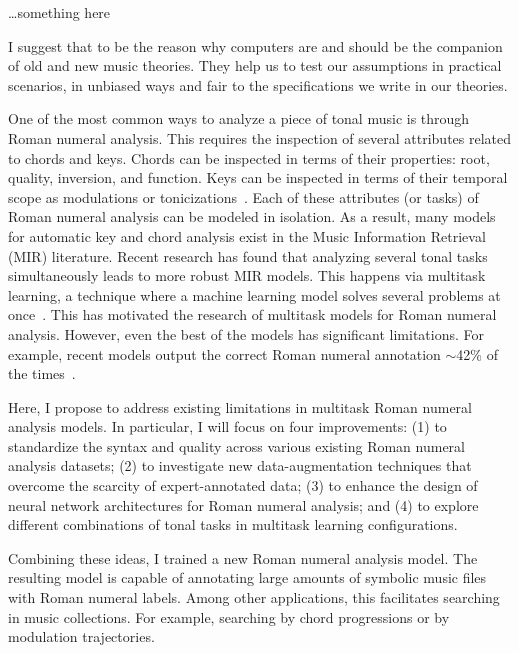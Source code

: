 \dots something here

I suggest that to be the reason why computers are and should
be the companion of old and new music theories. They help us
to test our assumptions in practical scenarios, in unbiased
ways and fair to the specifications we write in our theories.

One of the most common ways to analyze a piece of tonal
music is through Roman numeral analysis. This requires the
inspection of several attributes related to chords and keys.
Chords can be inspected in terms of their properties: root,
quality, inversion, and function. Keys can be inspected in
terms of their temporal scope as modulations or
tonicizations~\parencite{napoles_lopez2020local}. Each of
these attributes (or tasks) of Roman numeral analysis can be
modeled in isolation. As a result, many models for automatic
key and chord analysis exist in the Music Information
Retrieval (MIR) literature. Recent research has found that
analyzing several tonal tasks simultaneously leads to more
robust MIR models. This happens via multitask learning, a
technique where a machine learning model solves several
problems at once~\parencite{ruder2017overview}. This has
motivated the research of multitask models for Roman numeral
analysis. However, even the best of the models has
significant limitations. For example, recent models output
the correct Roman numeral annotation $\sim$42\% of the
times~\parencite{chen2021attend, micchi2020not}.

Here, I propose to address existing limitations in multitask
Roman numeral analysis models. In particular, I will focus
on four improvements: (1) to standardize the syntax and
quality across various existing Roman numeral analysis
datasets; (2) to investigate new data-augmentation
techniques that overcome the scarcity of expert-annotated
data; (3) to enhance the design of neural network
architectures for Roman numeral analysis; and (4) to explore
different combinations of tonal tasks in multitask learning
configurations.

Combining these ideas, I trained a new Roman numeral
analysis model. The resulting model is capable of annotating
large amounts of symbolic music files with Roman numeral
labels. Among other applications, this facilitates searching
in music collections. For example, searching by chord
progressions or by modulation trajectories.
